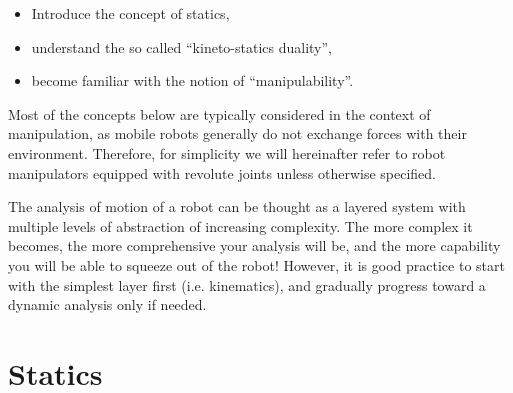 \begin{itemize}
\item Introduce the concept of statics,
\item understand the so called ``kineto-statics duality'',
\item become familiar with the notion of ``manipulability''.
\end{itemize}

Most of the concepts below are typically considered in the context of manipulation, as mobile robots generally do not exchange forces with their environment.
Therefore, for simplicity we will hereinafter refer to robot manipulators equipped with revolute joints unless otherwise specified.

\begin{mdframed}
\noindent The analysis of motion of a robot can be thought as a layered system with multiple levels of abstraction of increasing complexity.
The more complex it becomes, the more comprehensive your analysis will be, and the more capability you will be able to squeeze out of the robot!
However, it is good practice to start with the simplest layer first (i.e. kinematics), and gradually progress toward a dynamic analysis only if needed.
\end{mdframed}

\section{Statics}\label{sec:forces:statics}

